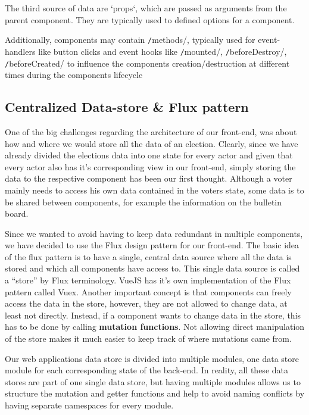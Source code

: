The third source of data are `props`, which are passed as arguments from the parent component. They are typically used to defined options for a component.

Additionally, components may contain \texttt/methods/, typically used for event-handlers like button clicks and event hooks like \texttt/mounted/, \texttt/beforeDestroy/, \texttt/beforeCreated/ to influence the components creation/destruction at different times during the components lifecycle

\subsection{Centralized Data-store \& Flux pattern}
One of the big challenges regarding the architecture of our front-end, was about how and where we would store all the data of an election. Clearly, since we have already divided the elections data into one state for every actor and given that every actor also has it's corresponding view in our front-end, simply storing the data to the respective component has been our first thought. Although a voter mainly needs to access his own data contained in the voters state, some data is to be shared between components, for example the information on the bulletin board.

Since we wanted to avoid having to keep data redundant in multiple components, we have decided to use the Flux design pattern for our front-end. The basic idea of the flux pattern is to have a single, central data source where all the data is stored and which all components have access to. This single data source is called a "`store"' by Flux terminology. VueJS has it's own implementation of the Flux pattern called Vuex. Another important concept is that components can freely access the data in the store, however, they are not allowed to change data, at least not directly. Instead, if a component wants to change data in the store, this has to be done by calling \textbf{mutation functions}. Not allowing direct manipulation of the store makes it much easier to keep track of where mutations came from.

Our web applications data store is divided into multiple modules, one data store module for each corresponding state of the back-end. In reality, all these data stores are part of one single data store, but having multiple modules allows us to structure the mutation and getter functions and help to avoid naming conflicts by having separate namespaces for every module. 

